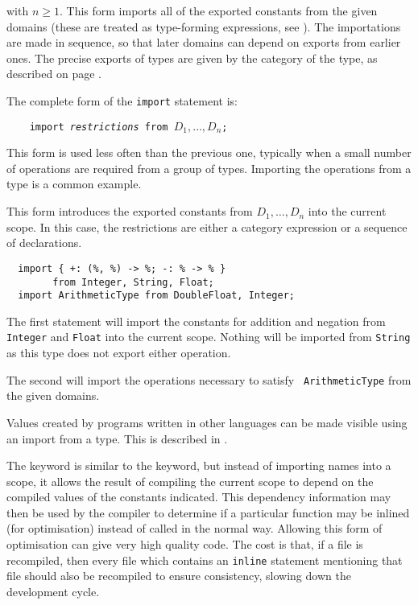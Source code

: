 with $n \geq 1$.  This form imports all of the exported constants from the
given domains (these are treated as type-forming expressions, see
). The importations are made in sequence, so that later
domains can depend on exports from earlier ones. The precise exports
of types are given by the category of the type, as described on page
\pageref{asugLangTypesExports}.

The complete form of the {\tt import} statement is:

\verb^    ^{\tt import {\em restrictions} from $D_1, \ldots, D_n$;}

This form is used less often than the previous one, typically when a
small number of operations are required from a group of types.
Importing the \ttin{<<} operations from a type is a common example.

This form introduces the exported constants from  $D_1, \ldots, D_n$ into
the current scope. In this case, the restrictions are either a category
expression or a sequence of declarations.

\begin{small}
\begin{verbatim}
  import { +: (%, %) -> %; -: % -> % }
        from Integer, String, Float;
  import ArithmeticType from DoubleFloat, Integer;
\end{verbatim}
\end{small}

The first statement will import the constants for addition and
negation from {\tt Integer} and {\tt Float} into the current
scope. Nothing will be imported from {\tt String} as this type does
not export either operation.

The second will import the operations necessary to satisfy {\tt
ArithmeticType} from the given domains.

Values created by programs written in other languages can be made visible
using an import from a  type.
This is described in .


The  keyword is similar to the  keyword,
but instead of importing names into a scope, it allows the result of
compiling the current scope to depend on the compiled values of the
constants indicated. This dependency information may then be used by
the compiler to determine if a particular function may be inlined
(for optimisation) instead of called in the normal way. Allowing
this form of optimisation can give very high quality code.  The cost
is that, if a file is recompiled, then every file which contains an
{\tt inline} statement mentioning that file should also be recompiled to
ensure consistency, slowing down the development cycle.

